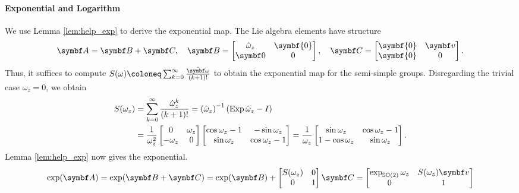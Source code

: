 \paragraph{Exponential and Logarithm}

We use Lemma \ref{lem:help_exp} to derive the exponential map. The Lie algebra elements have structure
\begin{equation}
  \A = \B + \C, \quad \B = \begin{bmatrix} \hat \omega_{z} & \symbf{0} \\ \symbf 0 & 0 \end{bmatrix}, \quad \C = \begin{bmatrix} \symbf{0} & \bv \\ \symbf{0} & 0 \end{bmatrix}.
\end{equation}
Thus, it suffices to compute $S(\omega) \coloneq \sum_{k = 0}^\infty \frac{\hat \bomega}{(k+1)!}$ to obtain the exponential map for the semi-simple groups. Disregarding the trivial case $\omega_{z} = 0$, we obtain
\begin{equation}
  \label{eq:se2_s_omegaz}
  \begin{aligned}
    S(\omega_z)
     & = \sum_{k = 0}^\infty \frac{\hat \omega_z^k}{(k+1)!} = \left( \hat \omega_z \right)^{-1} \left( \operatorname{Exp} \hat \omega_z - I \right) \\
     & = \frac{1}{\omega_z^2} \begin{bmatrix}
      0 & \omega_z \\ -\omega_z & 0
    \end{bmatrix} \begin{bmatrix}
      \cos \omega_z - 1 & -\sin \omega_z \\ \sin \omega_z & \cos \omega_z - 1
    \end{bmatrix} =  \frac{1}{\omega_z}\begin{bmatrix}
      \sin \omega_z     & \cos \omega_z - 1 \\
      1 - \cos \omega_z & \sin \omega_z
    \end{bmatrix}.
  \end{aligned}
\end{equation}
Lemma \ref{lem:help_exp} now gives the exponential.
\begin{equation}
  \label{eq:6}
  \exp(\A) = \exp(\B + \C) = \exp(\B) + \begin{bmatrix} S(\omega_{z}) & 0 \\ 0 & 1 \end{bmatrix} \C = \begin{bmatrix} \exp_{\SOtwo} \omega_{z} & S(\omega_{z}) \bv \\ 0 & 1 \end{bmatrix}
\end{equation}


